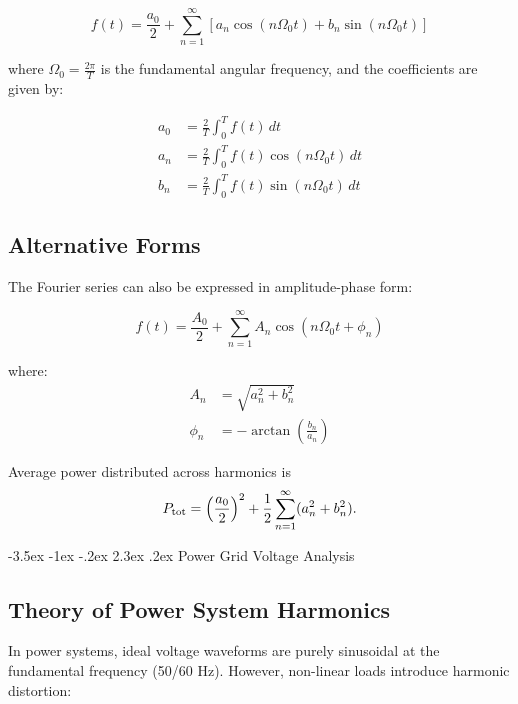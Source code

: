 \documentclass[nohyper,nobib,xcolor=dvipsnames,svgnames,x11names]{tufte-book}
\makeatletter
\renewcommand\section{\@startsection{section}{1}{\z@}%
                     {-3.5ex \@plus -1ex \@minus -.2ex}%
                     {2.3ex \@plus.2ex}%
                     {\normalfont\Large\bfseries\color{darkorange}}}
\makeatother
\begin{document}
\begin{equation}
f(t) = \frac{a_0}{2} + \sum_{n=1}^{\infty} \left[a_n \cos(n\Omega_0 t) + b_n \sin(n\Omega_0 t)\right]
\end{equation}

where $\Omega_0 = \frac{2\pi}{T}$ is the fundamental angular frequency, and the coefficients are given by:

\begin{align}
a_0 &= \frac{2}{T} \int_{0}^{T} f(t) \, dt \\
a_n &= \frac{2}{T} \int_{0}^{T} f(t) \cos(n\Omega_0 t) \, dt \\
b_n &= \frac{2}{T} \int_{0}^{T} f(t) \sin(n\Omega_0 t) \, dt
\end{align}

\subsection{Alternative Forms}

The Fourier series can also be expressed in amplitude-phase form:

\begin{equation}
f(t) = \frac{A_0}{2} + \sum_{n=1}^{\infty} A_n \cos(n\Omega_0 t + \phi_n)
\end{equation}

where:
\begin{align}
A_n &= \sqrt{a_n^2 + b_n^2} \\
\phi_n &= -\arctan\left(\frac{b_n}{a_n}\right)
\end{align}

Average power distributed across harmonics is
\begin{equation}
P_{\text{tot}}=\Bigl(\frac{a_{0}}{2}\Bigr)^{2}+\frac{1}{2}\sum_{n=1}^{\infty}(a_{n}^{2}+b_{n}^{2}).
\end{equation}


\section{Power Grid Voltage Analysis}

\subsection{Theory of Power System Harmonics}

In power systems, ideal voltage waveforms are purely sinusoidal at the fundamental frequency (50/60 Hz). However, non-linear loads introduce harmonic distortion:
\end{document}
